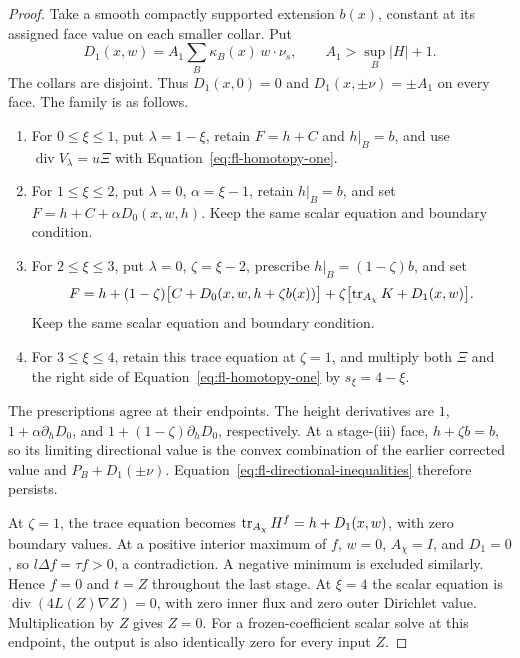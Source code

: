 \begin{proof}
Take a smooth compactly supported extension \(b(x)\), constant at its
assigned face value on each smaller collar.  Put
\[
 D_1(x,w)=A_1\sum_B\kappa_B(x)\,w\cdot\nu_s,\qquad
 A_1>\sup_B\lvert H\rvert+1 .
\]
The collars are disjoint.  Thus \(D_1(x,0)=0\) and
\(D_1(x,\pm\nu)=\pm A_1\) on every face.
The family is as follows.
\begin{enumerate}[label=\textup{(\roman*)}]
 \item For \(0\le\xi\le1\), put \(\lambda=1-\xi\), retain
 \(F=h+C\) and \(h|_B=b\), and use
 \(\operatorname{div}V_\lambda=u\Xi\) with
 Equation~\eqref{eq:fl-homotopy-one}.
 \item For \(1\le\xi\le2\), put \(\lambda=0\), \(\alpha=\xi-1\),
 retain \(h|_B=b\), and set
 \(F=h+C+\alpha D_0(x,w,h)\).
 Keep the same scalar equation and boundary condition.
 \item For \(2\le\xi\le3\), put \(\lambda=0\), \(\zeta=\xi-2\),
 prescribe \(h|_B=(1-\zeta)b\), and set
 \begin{equation}
 \label{eq:fl-homotopy-three}
 F=h+(1-\zeta)\bigl[C+D_0(x,w,h+\zeta b(x))\bigr]
          +\zeta\bigl[\operatorname{tr}_{A_\chi}K+D_1(x,w)\bigr].
 \end{equation}
 Keep the same scalar equation and boundary condition.
 \item For \(3\le\xi\le4\), retain this trace equation at
 \(\zeta=1\), and multiply both \(\Xi\) and the right side of
 Equation~\eqref{eq:fl-homotopy-one} by \(s_\xi=4-\xi\).
\end{enumerate}
The prescriptions agree at their endpoints.  The height derivatives
are \(1\), \(1+\alpha\partial_hD_0\), and
\(1+(1-\zeta)\partial_hD_0\), respectively.  At a stage-(iii) face,
\(h+\zeta b=b\), so its limiting directional value is the convex
combination of the earlier corrected value and \(P_B+D_1(\pm\nu)\).
Equation~\eqref{eq:fl-directional-inequalities} therefore persists.

At \(\zeta=1\), the trace equation becomes
\(\operatorname{tr}_{A_\chi}H^f=h+D_1(x,w)\), with zero boundary values.
At a positive interior maximum of \(f\), \(w=0\), \(A_\chi=I\),
and \(D_1=0\), so \(l\Delta f=\tau f>0\), a contradiction.
A negative minimum is excluded similarly.  Hence \(f=0\) and \(t=Z\)
throughout the last stage.  At \(\xi=4\) the scalar equation is
\(\operatorname{div}(4L(Z)\nabla Z)=0\), with zero inner flux and
zero outer Dirichlet value.  Multiplication by \(Z\) gives \(Z=0\).
For a frozen-coefficient scalar solve at this endpoint, the output is
also identically zero for every input \(Z\).
\end{proof}

